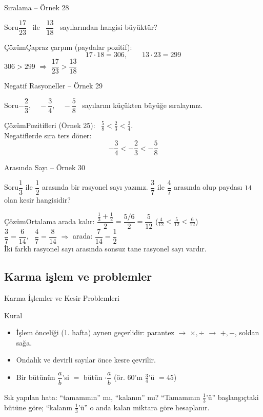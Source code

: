 \documentclass[aspectratio=169,11pt]{beamer}
\newcommand{\soru}[3]{%
\begin{frame}{#1}
  \begin{block}{Soru}\large #2\end{block}
  \pause
  \begin{exampleblock}{Çözüm}\large #3\end{exampleblock}
\end{frame}}
\begin{document}
\soru{Sıralama -- Örnek 28}
{\(\dfrac{17}{23}\) \ ile \ \(\dfrac{13}{18}\) \ sayılarından hangisi büyüktür?}
{Çapraz çarpım (paydalar pozitif):
\[17\cdot 18=306,\qquad 13\cdot 23=299\]
\(306>299\) \(\Rightarrow\) \(\dfrac{17}{23}>\dfrac{13}{18}\)}

\soru{Negatif Rasyoneller -- Örnek 29}
{\(-\dfrac{2}{3},\quad -\dfrac{3}{4},\quad -\dfrac{5}{8}\) \ sayılarını küçükten büyüğe sıralayınız.}
{Pozitifleri (Örnek 25): \ \(\frac{5}{8}<\frac{2}{3}<\frac{3}{4}\).\\[3pt]
Negatiflerde sıra ters döner:
\[-\frac{3}{4}<-\frac{2}{3}<-\frac{5}{8}\]}

\soru{Arasında Sayı -- Örnek 30}
{\(\dfrac{1}{3}\) ile \(\dfrac{1}{2}\) arasında bir rasyonel sayı yazınız. \(\dfrac{3}{7}\) ile \(\dfrac{4}{7}\) arasında olup paydası \(14\) olan kesir hangisidir?}
{Ortalama arada kalır: \(\dfrac{\frac{1}{3}+\frac{1}{2}}{2}=\dfrac{5/6}{2}=\dfrac{5}{12}\) \quad (\(\frac{4}{12}<\frac{5}{12}<\frac{6}{12}\))\\[4pt]
\(\dfrac{3}{7}=\dfrac{6}{14}\), \ \(\dfrac{4}{7}=\dfrac{8}{14}\) \(\Rightarrow\) arada: \(\dfrac{7}{14}=\dfrac{1}{2}\)\\[3pt]
{\normalsize İki farklı rasyonel sayı arasında sonsuz tane rasyonel sayı vardır.}}

\subsection{Karma işlem ve problemler}
\begin{frame}{Karma İşlemler ve Kesir Problemleri}
\begin{block}{Kural}
\begin{itemize}
\item İşlem önceliği (1. hafta) aynen geçerlidir: parantez \(\to\) \(\times,\div\) \(\to\) \(+,-\), soldan sağa.
\item Ondalık ve devirli sayılar önce kesre çevrilir.
\item Bir bütünün \(\dfrac{a}{b}\)'si \(=\) bütün \(\cdot\dfrac{a}{b}\) \quad (ör. \(60\)'ın \(\frac{3}{4}\)'ü \(=45\))
\end{itemize}
\end{block}
\begin{alertblock}{Sık yapılan hata: ``tamamının'' mı, ``kalanın'' mı?}
``Tamamının \(\frac{1}{3}\)'ü'' başlangıçtaki bütüne göre; ``kalanın \(\frac{1}{3}\)'ü'' o anda kalan miktara göre hesaplanır.
\end{alertblock}
\end{frame}
\end{document}
